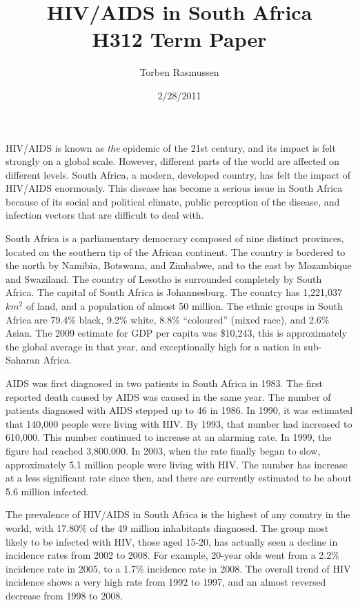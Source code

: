 \documentclass[12pt]{report}
\title{HIV/AIDS in South Africa \\ \normalsize{H312 Term Paper}}
\author{Torben Rasmussen}
\date{2/28/2011}
\begin{document}
\maketitle

HIV/AIDS is known as \emph{the} epidemic of the 21st century, and its impact is felt strongly on a global scale.
However, different parts of the world are affected on different levels.  
South Africa, a modern, developed country, has felt the impact of HIV/AIDS enormously.
This disease has become a serious issue in South Africa because of its social and political climate, public perception of the disease, and infection vectors that are difficult to deal with. 

South Africa is a parliamentary democracy composed of nine distinct provinces, located on the southern tip of the African continent.
The country is bordered to the north by Namibia, Botswana, and Zimbabwe, and to the east by Mozambique and Swaziland.  
The country of Lesotho is surrounded completely by South Africa\cite{wiki-sa}.
The capital of South Africa is Johannesburg.  
The country has 1,221,037 $km^2$ of land, and a population of almost 50 million.  
The ethnic groups in South Africa are 79.4\% black, 9.2\% white, 8.8\% ``coloured'' (mixed race), and 2.6\% Asian.  The 2009 estimate for GDP per capita was \$10,243, this is approximately the global average in that year, and exceptionally high for a nation in sub-Saharan Africa\cite{gap-gdp}.

AIDS was first diagnosed in two patients in South Africa in 1983.  
The first reported death caused by AIDS was caused in the same year.
The number of patients diagnosed with AIDS stepped up to 46 in 1986.
In 1990, it was estimated that 140,000 people were living with HIV.
By 1993, that number had increased to 610,000.
This number continued to increase at an alarming rate.  
In 1999, the figure had reached 3,800,000.
In 2003, when the rate finally began to slow, approximately 5.1 million people were living with HIV.
The number has increase at a less significant rate since then, and there are currently estimated to be about 5.6 million infected.

The prevalence of HIV/AIDS in South Africa is the highest of any country in the world, with 17.80\% of the 49 million inhabitants diagnosed\cite{cia}.
The group most likely to be infected with HIV, those aged 15-20, has actually seen a decline in incidence rates from 2002 to 2008\cite{shisana}.
For example, 20-year olds went from a 2.2\% incidence rate in 2005, to a 1.7\% incidence rate in 2008.
The overall trend of HIV incidence shows a very high rate from 1992 to 1997, and an almost reversed decrease from 1998 to 2008\cite{gap-incidence}.
\end{document}
